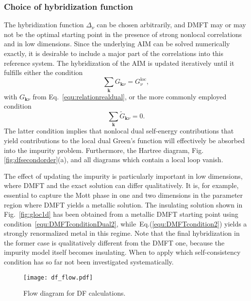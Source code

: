 \documentclass[rmp,aps,reprint,amsmath,amssymb,superscriptaddress,showpacs,nofootinbib]{revtex4-1}
\begin{document}
\subsubsection{Choice of hybridization function}
\label{sec:choosedeltanu}

The hybridization function $\Delta_{\nu}$ can be chosen arbitrarily, and DMFT may or may not be the optimal starting point in the presence of strong nonlocal correlations and in low dimensions. Since the underlying AIM can be solved numerically exactly, it is  desirable to include a major part of the correlations into this reference system. The hybridization of the AIM is updated iteratively until it fulfills either the condition
\begin{equation}
\label{equ:DMFTcondition2}
  \sum_{\mathbf{k}} G_{\mathbf{k}\nu}=G^\text{loc}_\nu,
\end{equation}
with $G_{\mathbf{k}\nu}$ from Eq.~\eqref{equ:relationrealdual}, or the more commonly employed condition
\begin{equation}
\label{equ:DMFTconditionDual2}
  \sum_{\mathbf{k}}\widetilde{G}_{\mathbf{k}\nu}=0.
\end{equation}
The latter condition implies that nonlocal dual self-energy contributions that yield contributions to the local dual Green's function will effectively be absorbed into the impurity problem. Furthermore, the Hartree diagram, Fig.\ref{fig:dfsecondorder}(a), and all diagrams which contain a local loop vanish.

The effect of  updating the impurity  is particularly important in low dimensions, where DMFT and the exact solution can differ qualitatively. It is, for example, essential to capture the Mott phase in one and two dimensions in the parameter region where DMFT yields a metallic solution. The insulating solution shown in Fig.~\ref{fig:gloc1d} has been obtained from a metallic DMFT starting point using condition~\eqref{equ:DMFTconditionDual2}, while~Eq.(\ref{equ:DMFTcondition2}) yields a strongly renormalized metal in this regime. Note that the final hybridization in the former case is qualitatively different from the DMFT one, because the impurity model itself becomes insulating.
When to apply which self-consistency condition has so far not been investigated systematically.

\begin{figure}[t!]
  \centering
  \texttt{[image: df\_flow.pdf]}
    \caption{Flow diagram for DF calculations.}
  \label{fig:df_flow}
\end{figure}
\end{document}
